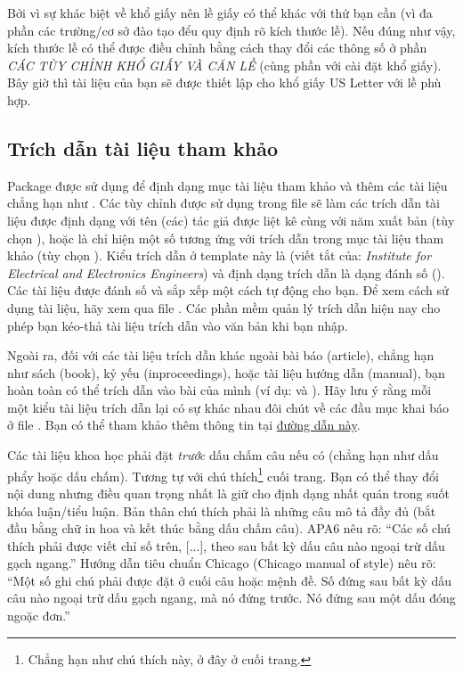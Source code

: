 Bởi vì sự khác biệt về khổ giấy nên lề giấy có thể khác với thứ bạn cần (vì đa phần các trường/cơ sở đào tạo đểu quy định rõ kích thước lề). Nếu đúng như vậy, kích thước lề có thể được điều chỉnh bằng cách thay đổi các thông số ở phần \emph{CÁC TÙY CHỈNH KHỔ GIẤY VÀ CĂN LỀ} (cùng phần với cài đặt khổ giấy). Bây giờ thì tài liệu của bạn sẽ được thiết lập cho khổ giấy US Letter với lề phù hợp.


\subsection{Trích dẫn tài liệu tham khảo}

Package  được sử dụng để định dạng mục tài liệu tham khảo và thêm các tài liệu chẳng hạn như \cite{Reference1}. Các tùy chỉnh được sử dụng trong file  sẽ làm các trích dẫn tài liệu được định dạng với tên (các) tác giả được liệt kê cùng với năm xuất bản (tùy chọn ), hoặc là chỉ hiện một số tương ứng với trích dẫn trong mục tài liệu tham khảo (tùy chọn ). Kiểu trích dẫn ở template này là  (viết tắt của: \textit{Institute for Electrical and Electronics Engineers}) và định dạng trích dẫn là dạng đánh số (). Các tài liệu được đánh số và sắp xếp một cách tự động cho bạn. Để xem cách sử dụng tài liệu, hãy xem qua file . Các phần mềm quản lý trích dẫn hiện nay cho phép bạn kéo-thả tài liệu trích dẫn vào văn bản khi bạn nhập.

Ngoài ra, đối với các tài liệu trích dẫn khác ngoài bài báo (article), chẳng hạn như sách (book), kỷ yếu (inproceedings), hoặc tài liệu hướng dẫn (manual), bạn hoàn toàn có thể trích dẫn vào bài của mình (ví dụ: \cite{Reference4} và \cite{Reference5}). Hãy lưu ý rằng mỗi một kiểu tài liệu trích dẫn lại có sự khác nhau đôi chút về các đầu mục khai báo ở file . Bạn có thể tham khảo thêm thông tin tại \href{https://www.bibtex.com/e/entry-types/#manual}{đường dẫn này}. 

Các tài liệu khoa học phải đặt \emph{trước} dấu chấm câu nếu có (chẳng hạn như dấu phẩy hoặc dấu chấm). Tương tự với chú thích\footnote{Chẳng hạn như chú thích này, ở đây ở cuối trang.} cuối trang. Bạn có thể thay đổi nội dung nhưng điều quan trọng nhất là giữ cho định dạng nhất quán trong suốt khóa luận/tiểu luận. Bản thân chú thích phải là những câu mô tả đầy đủ (bắt đầu bằng chữ in hoa và kết thúc bằng dấu chấm câu). APA6 nêu rõ: \enquote{Các số chú thích phải được viết chỉ số trên, [...], theo sau bất kỳ dấu câu nào ngoại trừ dấu gạch ngang.} Hướng dẫn tiêu chuẩn Chicago (Chicago manual of style) nêu rõ: \enquote {Một số ghi chú phải được đặt ở cuối câu hoặc mệnh đề. Số đứng sau bất kỳ dấu câu nào ngoại trừ dấu gạch ngang, mà nó đứng trước. Nó đứng sau một dấu đóng ngoặc đơn.}

